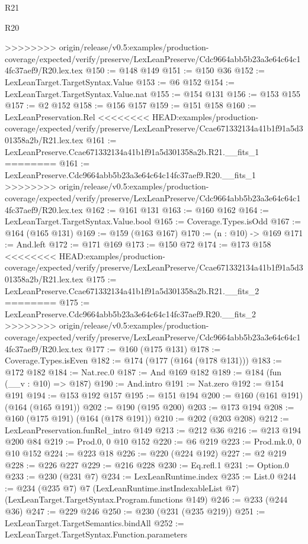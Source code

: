 \begin{lexlean}{R21}
\begin{lexlean}{R20}
\begin{coremodule}
{{{{{{{{{{{>>>>>>>> origin/release/v0.5:examples/production-coverage/expected/verify/preserve/LexLeanPreserve/Cdc9664abb5b23a3e64c64c14fc37aef9/R20.lex.tex
@150 := @148 @149
@151 := @150 @36
@152 := LexLeanTarget.TargetSyntax.Value
@153 := @6 @152
@154 := LexLeanTarget.TargetSyntax.Value.nat
@155 := @154 @131
@156 := @153 @155
@157 := @2 @152
@158 := @156 @157
@159 := @151 @158
@160 := LexLeanPreservation.Rel
<<<<<<<< HEAD:examples/production-coverage/expected/verify/preserve/LexLeanPreserve/Ccae671332134a41b1f91a5d301358a2b/R21.lex.tex
@161 := LexLeanPreserve.Ccae671332134a41b1f91a5d301358a2b.R21.__fits_1
========
@161 := LexLeanPreserve.Cdc9664abb5b23a3e64c64c14fc37aef9.R20.__fits_1
>>>>>>>> origin/release/v0.5:examples/production-coverage/expected/verify/preserve/LexLeanPreserve/Cdc9664abb5b23a3e64c64c14fc37aef9/R20.lex.tex
@162 := @161 @131
@163 := @160 @162
@164 := LexLeanTarget.TargetSyntax.Value.bool
@165 := Coverage.Types.isOdd
@167 := @164 (@165 @131)
@169 := @159 (@163 @167)
@170 := (n : @10) -> @169
@171 := And.left
@172 := @171 @169
@173 := @150 @72
@174 := @173 @158
<<<<<<<< HEAD:examples/production-coverage/expected/verify/preserve/LexLeanPreserve/Ccae671332134a41b1f91a5d301358a2b/R21.lex.tex
@175 := LexLeanPreserve.Ccae671332134a41b1f91a5d301358a2b.R21.__fits_2
========
@175 := LexLeanPreserve.Cdc9664abb5b23a3e64c64c14fc37aef9.R20.__fits_2
>>>>>>>> origin/release/v0.5:examples/production-coverage/expected/verify/preserve/LexLeanPreserve/Cdc9664abb5b23a3e64c64c14fc37aef9/R20.lex.tex
@177 := @160 (@175 @131)
@178 := Coverage.Types.isEven
@182 := @174 (@177 (@164 (@178 @131)))
@183 := @172 @182
@184 := Nat.rec.{0}
@187 := And @169 @182
@189 := @184 (fun (__v : @10) => @187)
@190 := And.intro
@191 := Nat.zero
@192 := @154 @191
@194 := @153 @192 @157
@195 := @151 @194
@200 := @160 (@161 @191) (@164 (@165 @191))
@202 := @190 (@195 @200)
@203 := @173 @194
@208 := @160 (@175 @191) (@164 (@178 @191))
@210 := @202 (@203 @208)
@212 := LexLeanPreservation.funRel_intro @149
@213 := @212 @36
@216 := @213 @194 @200 @84
@219 := Prod.{0, 0} @10 @152
@220 := @6 @219
@223 := Prod.mk.{0, 0} @10 @152
@224 := @223 @18
@226 := @220 (@224 @192)
@227 := @2 @219
@228 := @226 @227
@229 := @216 @228
@230 := Eq.refl.{1}
@231 := Option.{0}
@233 := @230 (@231 @7)
@234 := LexLeanRuntime.index
@235 := List.{0}
@244 := @234
    (@235 @7)
    @7
    (LexLeanRuntime.instIndexableList @7)
    (LexLeanTarget.TargetSyntax.Program.functions @149)
@246 := @233 (@244 @36)
@247 := @229 @246
@250 := @230 (@231 (@235 @219))
@251 := LexLeanTarget.TargetSemantics.bindAll
@252 := LexLeanTarget.TargetSyntax.Function.parameters
}}}}}}}}}}}
\end{coremodule}
\end{lexlean}
\end{lexlean}
